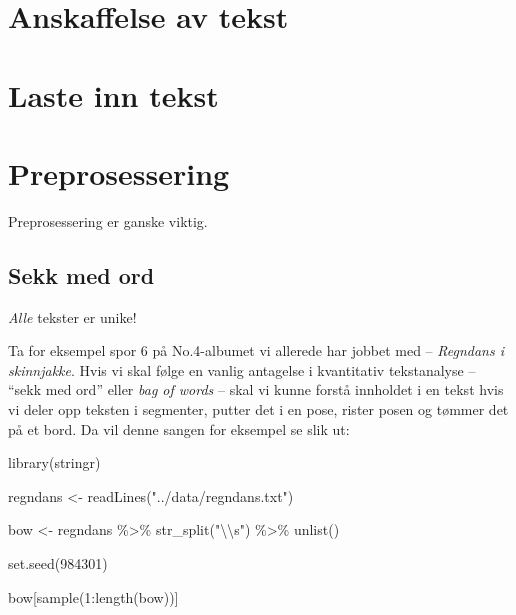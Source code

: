\documentclass[
]{book}
\newenvironment{Shaded}{\begin{snugshade}}{\end{snugshade}}
\newcommand{\DecValTok}[1]{\textcolor[rgb]{0.00,0.00,0.81}{#1}}
\newcommand{\FunctionTok}[1]{\textcolor[rgb]{0.00,0.00,0.00}{#1}}
\newcommand{\NormalTok}[1]{#1}
\newcommand{\OtherTok}[1]{\textcolor[rgb]{0.56,0.35,0.01}{#1}}
\newcommand{\SpecialCharTok}[1]{\textcolor[rgb]{0.00,0.00,0.00}{#1}}
\newcommand{\StringTok}[1]{\textcolor[rgb]{0.31,0.60,0.02}{#1}}
\begin{document}
\hypertarget{anskaff}{%
\chapter{Anskaffelse av tekst}\label{anskaff}}

\hypertarget{lastetekst}{%
\chapter{Laste inn tekst}\label{lastetekst}}

\hypertarget{prepros}{%
\chapter{Preprosessering}\label{prepros}}

Preprosessering er ganske viktig.

\hypertarget{sekk-med-ord}{%
\section{Sekk med ord}\label{sekk-med-ord}}

\emph{Alle} tekster er unike!

Ta for eksempel spor 6 på No.4-albumet vi allerede har jobbet med -- \emph{Regndans i skinnjakke}. Hvis vi skal følge en vanlig antagelse i kvantitativ tekstanalyse -- ``sekk med ord'' eller \emph{bag of words} -- skal vi kunne forstå innholdet i en tekst hvis vi deler opp teksten i segmenter, putter det i en pose, rister posen og tømmer det på et bord. Da vil denne sangen for eksempel se slik ut:

\begin{Shaded}
\begin{Highlighting}[]
\FunctionTok{library}\NormalTok{(stringr)}

\NormalTok{regndans }\OtherTok{\textless{}{-}} \FunctionTok{readLines}\NormalTok{(}\StringTok{"../data/regndans.txt"}\NormalTok{)}

\NormalTok{bow }\OtherTok{\textless{}{-}}\NormalTok{ regndans }\SpecialCharTok{\%\textgreater{}\%} \FunctionTok{str\_split}\NormalTok{(}\StringTok{"}\SpecialCharTok{\textbackslash{}\textbackslash{}}\StringTok{s"}\NormalTok{) }\SpecialCharTok{\%\textgreater{}\%} \FunctionTok{unlist}\NormalTok{()}

\FunctionTok{set.seed}\NormalTok{(}\DecValTok{984301}\NormalTok{)}

\NormalTok{bow[}\FunctionTok{sample}\NormalTok{(}\DecValTok{1}\SpecialCharTok{:}\FunctionTok{length}\NormalTok{(bow))]}
\end{Highlighting}
\end{Shaded}
\end{document}
